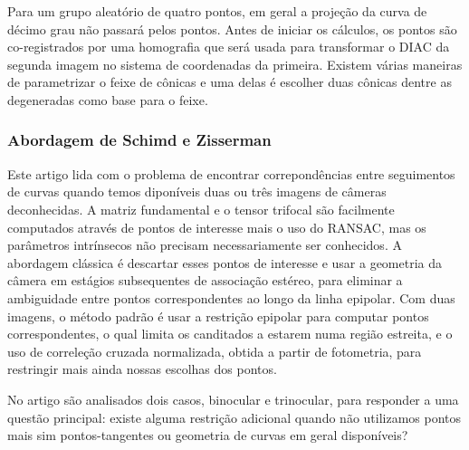 Para um grupo aleatório de quatro pontos, em geral a projeção da curva de décimo grau não passará pelos pontos. Antes de iniciar os cálculos, os pontos são co-registrados por uma homografia que será usada para transformar o DIAC  da segunda imagem no sistema de coordenadas da primeira. Existem várias maneiras de parametrizar o feixe de cônicas e uma delas é escolher duas cônicas dentre as degeneradas como base para o feixe.





\subsubsection{Abordagem de Schimd e Zisserman}

Este artigo lida com o problema de encontrar correpondências entre seguimentos de curvas quando temos diponíveis duas ou três imagens de câmeras deconhecidas. A matriz fundamental e o tensor trifocal são facilmente computados através de pontos de interesse mais o uso do RANSAC, mas os parâmetros intrínsecos não precisam necessariamente ser conhecidos. A abordagem clássica é descartar esses pontos de interesse e usar a geometria da câmera em estágios subsequentes de associação estéreo, para eliminar a ambiguidade entre pontos correspondentes ao longo da linha epipolar. Com duas imagens, o método padrão é usar a restrição epipolar para computar pontos correspondentes, o qual limita os canditados a estarem numa região estreita, e o uso de correleção cruzada normalizada, obtida a partir de fotometria, para restringir mais ainda nossas escolhas dos pontos. 

No artigo são analisados dois casos, binocular e trinocular, para responder a uma questão principal: existe alguma restrição adicional quando não utilizamos pontos mais sim pontos-tangentes ou geometria de curvas em geral disponíveis?\\


